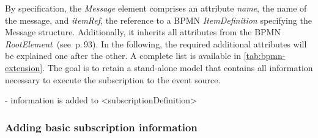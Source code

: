 
By specification, the \textit{Message} element comprises an attribute \textit{name}, the name of the message, and \textit{itemRef}, the reference to a BPMN \textit{ItemDefinition} specifying the Message structure. Additionally, it inherits all attributes from the BPMN \textit{RootElement}~(see \cite{bpmnspec}\,p.\,93).
In the following, the required additional attributes will be explained one after the other. A complete list is available in \autoref{tab:bpmn-extension}. The goal is to retain a stand-alone model that contains all information necessary to execute the subscription to the event source.

- information is added to <subscriptionDefinition>



\subsubsection*{Adding basic subscription information}\label{ch:bpmnx:basic}

